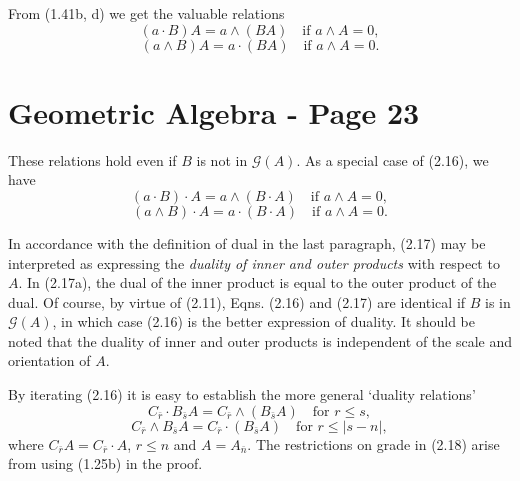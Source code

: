 \documentclass[fleqn]{scrartcl}
\numberwithin{equation}{section}
\begin{document}
\vspace{1em}
\noindent From (1.41b, d) we get the valuable relations
\begin{equation}
(a \cdot B)A = a \wedge (BA) \quad \text{if } a \wedge A = 0, \tag{2.16a}
\end{equation}
\begin{equation}
(a \wedge B)A = a \cdot (BA) \quad \text{if } a \wedge A = 0. \tag{2.16b}
\end{equation}

\section*{Geometric Algebra - Page 23}

\noindent These relations hold even if \(B\) is not in \(\mathscr{G}(A)\). As a special case of (2.16), we have
\begin{equation}
(a \cdot B) \cdot A = a \wedge (B \cdot A) \quad \text{if } a \wedge A = 0, \tag{2.17a}
\end{equation}
\begin{equation}
(a \wedge B) \cdot A = a \cdot (B \cdot A) \quad \text{if } a \wedge A = 0. \tag{2.17b}
\end{equation}

\vspace{1em}
\noindent In accordance with the definition of dual in the last paragraph, (2.17) may be interpreted as expressing the \textit{duality of inner and outer products} with respect to \(A\). In (2.17a), the dual of the inner product is equal to the outer product of the dual. Of course, by virtue of (2.11), Eqns. (2.16) and (2.17) are identical if \(B\) is in \(\mathscr{G}(A)\), in which case (2.16) is the better expression of duality. It should be noted that the duality of inner and outer products is independent of the scale and orientation of \(A\).

\vspace{1em}
\noindent By iterating (2.16) it is easy to establish the more general `duality relations'
\begin{equation}
C_{\bar{r}} \cdot B_{\bar{s}}A = C_{\bar{r}} \wedge (B_{\bar{s}}A) \quad \text{for } r \leq s, \tag{2.18a}
\end{equation}
\begin{equation}
C_{\bar{r}} \wedge B_{\bar{s}}A = C_{\bar{r}} \cdot (B_{\bar{s}}A) \quad \text{for } r \leq |s-n|, \tag{2.18b}
\end{equation}
where \(C_{\bar{r}}A = C_{\bar{r}} \cdot A\), \(r \leq n\) and \(A = A_{\bar{n}}\). The restrictions on grade in (2.18) arise from using (1.25b) in the proof.
\end{document}
